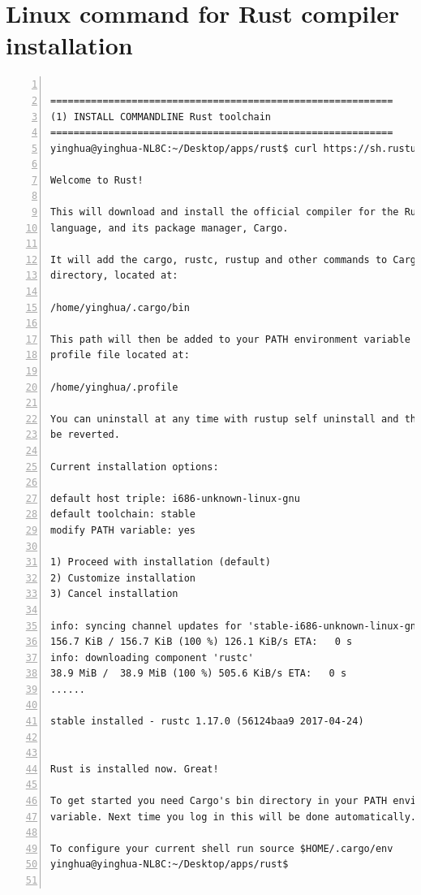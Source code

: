 \section{Linux command for Rust compiler installation}

\lstset{basicstyle=\ttfamily\tiny} 
\begin{lstlisting}[breaklines, frame=single, numbers=left, caption={Linux command for Rust compiler installation}, label=commandline-02]  
   
===========================================================
(1) INSTALL COMMANDLINE Rust toolchain
===========================================================
yinghua@yinghua-NL8C:~/Desktop/apps/rust$ curl https://sh.rustup.rs -sSf | sh

Welcome to Rust!

This will download and install the official compiler for the Rust programming
language, and its package manager, Cargo.

It will add the cargo, rustc, rustup and other commands to Cargo's bin
directory, located at:

/home/yinghua/.cargo/bin

This path will then be added to your PATH environment variable by modifying the
profile file located at:

/home/yinghua/.profile

You can uninstall at any time with rustup self uninstall and these changes will
be reverted.

Current installation options:

default host triple: i686-unknown-linux-gnu
default toolchain: stable
modify PATH variable: yes

1) Proceed with installation (default)
2) Customize installation
3) Cancel installation

info: syncing channel updates for 'stable-i686-unknown-linux-gnu'
156.7 KiB / 156.7 KiB (100 %) 126.1 KiB/s ETA:   0 s               
info: downloading component 'rustc'
38.9 MiB /  38.9 MiB (100 %) 505.6 KiB/s ETA:   0 s               
......

stable installed - rustc 1.17.0 (56124baa9 2017-04-24)


Rust is installed now. Great!

To get started you need Cargo's bin directory in your PATH environment
variable. Next time you log in this will be done automatically.

To configure your current shell run source $HOME/.cargo/env
yinghua@yinghua-NL8C:~/Desktop/apps/rust$ 


\end{lstlisting}
